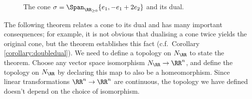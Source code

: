 \documentclass[12pt]{amsart}
\theoremstyle{plain}
\begin{document}
\begin{figure}[H]
    \centering
    \caption{The cone $\sigma=\Span_{\RR_{\ge 0}} \{e_1, - e_1 + 2 e_2\}$ and its dual.}
     \label{figureconeanddual}
\end{figure}

The following theorem relates a cone to its dual and has many important consequences;
for example, it is not obvious that dualising a cone twice yields the original cone, but the theorem establishes this fact (c.f.\ Corollary \ref{corollary:doubledual}).
We need to define a topology on $N_\RR$ to state the theorem.
Choose any vector space isomorphism $N_\RR \to \RR^n$, and define the topology on $N_\RR$ by declaring this map to also be a homeomorphism.
Since linear transformations $\RR^n \to \RR^n$ are continuous, the topology we have defined doesn't depend on the choice of isomorphism.
\end{document}
